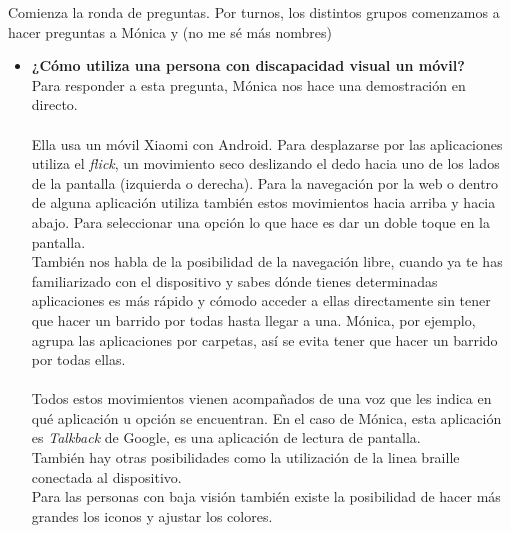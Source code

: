 \documentclass{article}
\begin{document}
	Comienza la ronda de preguntas. Por turnos, los distintos grupos comenzamos a hacer preguntas a Mónica y (no me sé más nombres)
	\\
	\begin{itemize}
		\item  \textbf{¿Cómo utiliza una persona con discapacidad visual un móvil?}
		\\
		Para responder a esta pregunta, Mónica nos hace una demostración en directo.
		\\
		\\
		Ella usa un móvil Xiaomi con Android. Para desplazarse por las aplicaciones utiliza el \textit{flick}, un movimiento seco deslizando el dedo hacia uno de los lados de la pantalla (izquierda o derecha). Para la navegación por la web o dentro de alguna aplicación utiliza también estos movimientos hacia arriba y hacia abajo. Para seleccionar una opción lo que hace es dar un doble toque en la pantalla.
		\\
		También nos habla de la posibilidad de la navegación libre, cuando ya te has familiarizado con el dispositivo y sabes dónde tienes  determinadas aplicaciones es más rápido y cómodo acceder a ellas directamente sin tener que hacer un barrido por todas hasta llegar a una. Mónica, por ejemplo, agrupa las aplicaciones por carpetas, así se evita tener que hacer un barrido por todas ellas.
		\\
		\\
		Todos estos movimientos vienen acompañados de una voz que les indica en qué aplicación u opción se encuentran. En el caso de Mónica, esta aplicación es \textit{Talkback} de Google, es una aplicación de lectura de pantalla. 
		\\
		También hay otras posibilidades como la utilización de la linea braille conectada al dispositivo. 
		\\
		Para las personas con baja visión también existe la posibilidad de hacer más grandes los iconos y ajustar los colores.
		

\end{itemize}
\end{document}
